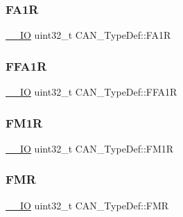 \mbox{\label{struct_c_a_n___type_def_ab57a3a6c337a8c6c7cb39d0cefc2459a}} 
\subsubsection{\texorpdfstring{FA1R}{FA1R}}
{\footnotesize\ttfamily \mbox{\hyperlink{group___c_m_s_i_s___c_m3__core__definitions_gaec43007d9998a0a0e01faede4133d6be}{\+\_\+\+\_\+\+IO}} uint32\+\_\+t C\+A\+N\+\_\+\+Type\+Def\+::\+F\+A1R}

\mbox{\label{struct_c_a_n___type_def_ae2decd14b26f851e00a31b42d15293ce}} 
\subsubsection{\texorpdfstring{FFA1R}{FFA1R}}
{\footnotesize\ttfamily \mbox{\hyperlink{group___c_m_s_i_s___c_m3__core__definitions_gaec43007d9998a0a0e01faede4133d6be}{\+\_\+\+\_\+\+IO}} uint32\+\_\+t C\+A\+N\+\_\+\+Type\+Def\+::\+F\+F\+A1R}

\mbox{\label{struct_c_a_n___type_def_aefe6a26ee25947b7eb5be9d485f4d3b0}} 
\subsubsection{\texorpdfstring{FM1R}{FM1R}}
{\footnotesize\ttfamily \mbox{\hyperlink{group___c_m_s_i_s___c_m3__core__definitions_gaec43007d9998a0a0e01faede4133d6be}{\+\_\+\+\_\+\+IO}} uint32\+\_\+t C\+A\+N\+\_\+\+Type\+Def\+::\+F\+M1R}

\mbox{\label{struct_c_a_n___type_def_a1a6a0f78ca703a63bb0a6b6f231f612f}} 
\subsubsection{\texorpdfstring{FMR}{FMR}}
{\footnotesize\ttfamily \mbox{\hyperlink{group___c_m_s_i_s___c_m3__core__definitions_gaec43007d9998a0a0e01faede4133d6be}{\+\_\+\+\_\+\+IO}} uint32\+\_\+t C\+A\+N\+\_\+\+Type\+Def\+::\+F\+MR}

